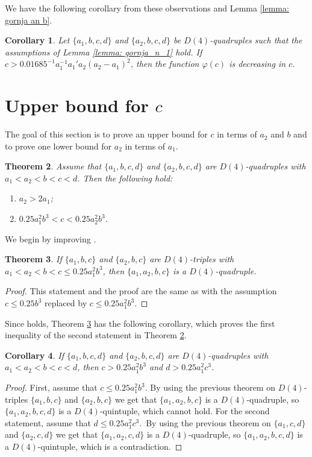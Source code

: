 \documentclass[12pt]{amsart}%
\newtheorem{theorem}{Theorem}[section]
\newtheorem{cor}[theorem]{Corollary}
\theoremstyle{definition}
\theoremstyle{remark}
\theoremstyle{plain}
\begin{document}
We have the following corollary from these observations and Lemma \ref{lemma: gornja an b}.
\begin{cor}\label{cor: primjena leme 3.4}
   Let $\{a_1,b,c,d\}$ and $\{a_2,b,c,d\}$ be $D(4)$-quadruples such that the assumptions of Lemma \ref{lemma: gornja_n_1} hold. If $c>0.01685^{-1}a_1^{-1}a_1'a_2(a_2-a_1)^2$, then the function $\varphi(c)$ is decreasing in $c$.
\end{cor}


\section{Upper bound for $c$}\label{sekcija_upper_c}

The goal of this section is to prove an upper bound for $c$ in terms of $a_2$ and $b$ and to prove one lower bound for $a_2$ in terms of $a_1$.
\begin{theorem}\label{tm5.1}
    Assume that $\{a_1,b,c,d\}$ and $\{a_2,b,c,d\}$ are $D(4)$-quadruples with $a_1<a_2<b<c<d$. Then the following hold:
    \begin{enumerate}[1)]
        \item $a_2>2a_1$;
        \item $0.25a_1^2b^3 < c < 0.25a_2^2b^3$.
    \end{enumerate}
\end{theorem}

We begin by improving \cite[Theorem 1.2]{mbtap1}.

\begin{theorem}  \label{tm5.2}
    If $\{a_1,b,c\}$ and $\{a_2,b,c\}$ are $D(4)$-triples with $a_1<a_2<b<c\leq 0.25a_1^2b^3$, then $\{a_1,a_2,b,c\}$ is a $D(4)$-quadruple.
\end{theorem}
\begin{proof}
   This statement and the proof are the same as \cite[Theorem 1.2]{mbtap1} with the assumption $c\leq 0.25b^3$ replaced by $c \leq 0.25a_1^2b^3$. 
\end{proof}

Since \cite[Theorem 1]{nas2} holds, Theorem \ref{tm5.2} has the following corollary, which proves the first inequality of the second statement in Theorem \ref{tm5.1}.

\begin{cor}\label{cor: donja na c i d}
If $\{a_1,b,c,d\}$ and $\{a_2,b,c,d\}$ are $D(4)$-quadruples with $a_1<a_2<b<c<d$, then $c>0.25a_1^2b^3$ and $d>0.25a_1^2c^3$.
\end{cor}
\begin{proof}
    First, assume that $c \leq 0.25a_1^2b^3$. By using the previous theorem on $D(4)$-triples $\{a_1,b,c\}$ and $\{a_2,b,c\}$  we get that $\{a_1,a_2,b,c\}$ is a $D(4)$-quadruple, so $\{a_1,a_2,b,c,d\}$ is a $D(4)$-quintuple, which cannot hold. For the second statement, assume that $d \leq 0.25a_1^2c^3$.\ By using the previous theorem on $\{a_1,c,d\}$ and $\{a_2,c,d\}$ we get that $\{a_1,a_2,c,d  \}$ is a $D(4)$-quadruple, so $\{a_1,a_2,b,c,d \}$ is a $D(4)$-quintuple, which is a contradiction.
\end{proof}
\end{document}
